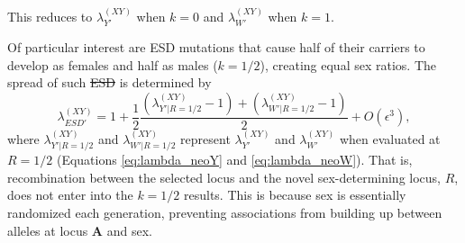 \documentclass[10pt,letterpaper]{article}
\providecommand{\DIFaddtex}[1]{{\protect\color{blue}\uwave{#1}}} %
\providecommand{\DIFdeltex}[1]{{\protect\color{red}\sout{#1}}}                      %
\providecommand{\DIFaddbegin}{} %
\providecommand{\DIFaddend}{} %
\providecommand{\DIFdelbegin}{} %
\providecommand{\DIFdelend}{} %
\providecommand{\DIFadd}[1]{\texorpdfstring{\DIFaddtex{#1}}{#1}} %
\providecommand{\DIFdel}[1]{\texorpdfstring{\DIFdeltex{#1}}{}} %
\newcommand{\DIFscaledelfig}{0.5}
\newlength{\DIFdelgraphicswidth} %
\newlength{\DIFdelgraphicsheight} %
\newcommand{\DIFaddincludegraphics}[2][]{{\color{blue}\fbox{\DIFOincludegraphics[#1]{#2}}}} %
\newcommand{\DIFdelincludegraphics}[2][]{%
\sbox{\DIFdelgraphicsbox}{\DIFOincludegraphics[#1]{#2}}%
\settoboxwidth{\DIFdelgraphicswidth}{\DIFdelgraphicsbox} %
\settoboxtotalheight{\DIFdelgraphicsheight}{\DIFdelgraphicsbox} %
\scalebox{\DIFscaledelfig}{%
\parbox[b]{\DIFdelgraphicswidth}{\usebox{\DIFdelgraphicsbox}\\[-\baselineskip] \rule{\DIFdelgraphicswidth}{0em}}\llap{\resizebox{\DIFdelgraphicswidth}{\DIFdelgraphicsheight}{%
\setlength{\unitlength}{\DIFdelgraphicswidth}%
\begin{picture}(1,1)%
\thicklines\linethickness{2pt} %
{\color[rgb]{1,0,0}\put(0,0){\framebox(1,1){}}}%
{\color[rgb]{1,0,0}\put(0,0){\line( 1,1){1}}}%
{\color[rgb]{1,0,0}\put(0,1){\line(1,-1){1}}}%
\end{picture}%
}\hspace*{3pt}}} %
} %
\DeclareRobustCommand{\DIFaddbegin}{\DIFOaddbegin \let\includegraphics\DIFaddincludegraphics} %
\DeclareRobustCommand{\DIFaddend}{\DIFOaddend \let\includegraphics\DIFOincludegraphics} %
\DeclareRobustCommand{\DIFdelbegin}{\DIFOdelbegin \let\includegraphics\DIFdelincludegraphics} %
\DeclareRobustCommand{\DIFdelend}{\DIFOaddend \let\includegraphics\DIFOincludegraphics} %
\begin{document}
\noindent
This reduces to $\lambda_{Y'}^{(XY)}$ when $k=0$ and $\lambda_{W'}^{(XY)}$ when $k=1$. 

Of particular interest are ESD mutations that cause half of their carriers to develop as females and half as males ($k=1/2$), creating equal sex ratios.
The spread of such \DIFdelbegin \DIFdel{ESD }\DIFdelend \DIFaddbegin \DIFadd{mutations }\DIFaddend is determined by
\begin{equation}
\lambda_{ESD'}^{(XY)} =1+ \frac{1}{2}\frac{(\lambda_{Y'\rvert R=1/2}^{(XY)}-1) + (\lambda_{W'\rvert R=1/2}^{(XY)}-1)}{2} + O\left(\epsilon^3\right),
\label{eq:lambda_ESD}
\end{equation}
\noindent
where $\lambda_{Y'\rvert R=1/2}^{(XY)}$ and $\lambda_{W'\rvert R=1/2}^{(XY)}$ represent $\lambda_{Y'}^{(XY)}$ and $\lambda_{W'}^{(XY)}$ when evaluated at $R=1/2$ (Equations \ref{eq:lambda_neoY} and \ref{eq:lambda_neoW}).
That is, recombination between the selected locus and the novel sex-determining locus, $R$, does not enter into the $k=1/2$ results.
This is because sex is essentially randomized each generation, %
preventing associations from building up between alleles at locus $\mathbf{A}$ and sex. 
\end{document}
